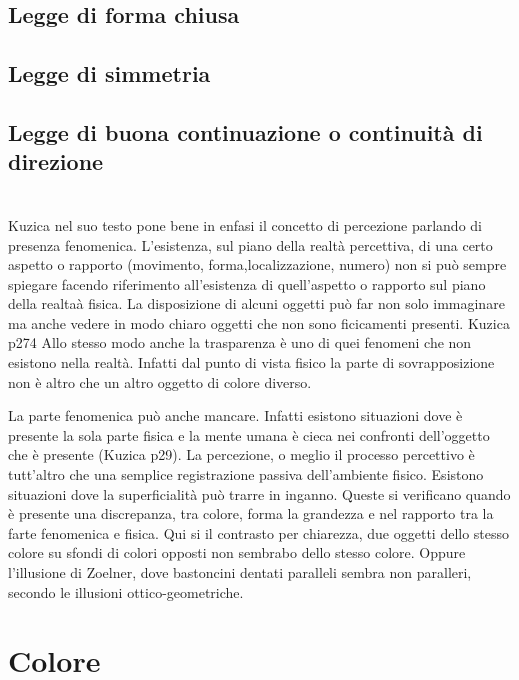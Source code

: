 \documentclass{ium}
\begin{document}
\subsection{Legge di forma chiusa}
\subsection{Legge di simmetria}
\subsection{Legge di buona continuazione o continuità di direzione}


\section{}

Kuzica nel suo testo pone bene in enfasi il concetto di percezione parlando di presenza fenomenica. 
L'esistenza, sul piano della realtà percettiva, di una certo aspetto o rapporto (movimento, forma,localizzazione, numero) non si può sempre spiegare facendo riferimento all'esistenza di quell'aspetto o rapporto sul piano della realtaà fisica.
La disposizione di alcuni oggetti può far non solo immaginare ma anche vedere in modo chiaro oggetti che non sono ficicamenti presenti. Kuzica p274
Allo stesso modo anche la trasparenza è uno di quei fenomeni che non esistono nella realtà. Infatti dal punto di vista fisico la parte di sovrapposizione non è altro che un altro oggetto di colore diverso.

La parte fenomenica può anche mancare. Infatti esistono situazioni dove è presente la sola parte fisica e la mente umana è cieca nei confronti dell'oggetto che è presente (Kuzica p29).  
La percezione, o meglio il processo percettivo è tutt'altro che una semplice registrazione passiva dell'ambiente fisico. Esistono situazioni dove la superficialità può trarre in inganno. Queste si verificano quando è presente una discrepanza, tra colore, forma la grandezza e nel rapporto tra la farte fenomenica e fisica. Qui si il contrasto per chiarezza, due oggetti dello stesso colore su sfondi di colori opposti non sembrabo dello stesso colore. Oppure l'illusione di Zoelner, dove bastoncini dentati paralleli sembra non paralleri, secondo le illusioni ottico-geometriche.

\section{Colore}
\end{document}
